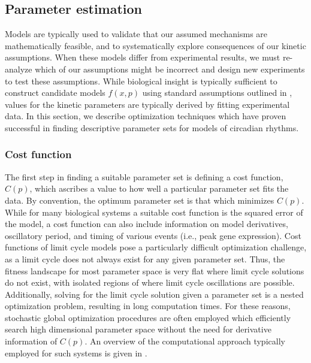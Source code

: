 \subsection{Parameter estimation}

Models are typically used to validate that our assumed mechanisms are mathematically feasible, and to systematically explore consequences of our kinetic assumptions.
When these models differ from experimental results, we must re-analyze which of our assumptions might be incorrect and design new experiments to test these assumptions.
While biological insight is typically sufficient to construct candidate models $f(x, p)$ using standard assumptions outlined in , values for the kinetic parameters are typically derived by fitting experimental data.
In this section, we describe optimization techniques which have proven successful in finding descriptive parameter sets for models of circadian rhythms.

\subsubsection{Cost function}

The first step in finding a suitable parameter set is defining a cost function, $C(p)$, which ascribes a value to how well a particular parameter set fits the data.
By convention, the optimum parameter set is that which minimizes $C(p)$.
While for many biological systems a suitable cost function is the squared error of the model, a cost function can also include information on model derivatives, oscillatory period, and timing of various events (i.e., peak gene expression).
Cost functions of limit cycle models pose a particularly difficult optimization challenge, as a limit cycle does not always exist for any given parameter set.
Thus, the fitness landscape for most parameter space is very flat where limit cycle solutions do not exist, with isolated regions of  where limit cycle oscillations are possible.
Additionally, solving for the limit cycle solution given a parameter set is a nested optimization problem, resulting in long computation times.
For these reasons, stochastic global optimization procedures are often employed which efficiently search high dimensional parameter space without the need for derivative information of $C(p)$.
An overview of the computational approach typically employed for such systems is given in .

